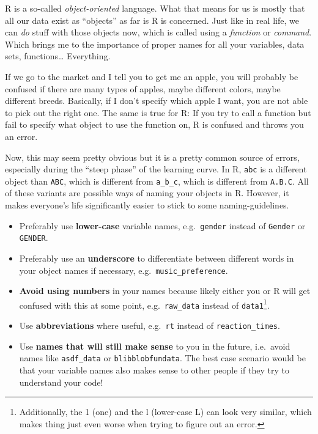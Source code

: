 \documentclass[
]{book}
\providecommand{\tightlist}{%
  \setlength{\itemsep}{0pt}\setlength{\parskip}{0pt}}
\begin{document}
R is a so-called \emph{object-oriented} language.
What that means for us is mostly that all our data exist as ``objects'' as far is R is concerned.
Just like in real life, we can \emph{do} stuff with those objects now, which is called using a \emph{function} or \emph{command}.
Which brings me to the importance of proper names for all your variables, data sets, functions\ldots{}
Everything.

If we go to the market and I tell you to get me an apple, you will probably be confused if there are many types of apples, maybe different colors, maybe different breeds.
Basically, if I don't specify which apple I want, you are not able to pick out the right one.
The same is true for R: If you try to call a function but fail to specify what object to use the function on, R is confused and throws you an error.

Now, this may seem pretty obvious but it is a pretty common source of errors, especially during the ``steep phase'' of the learning curve.
In R, \texttt{abc} is a different object than \texttt{ABC}, which is different from \texttt{a\_b\_c}, which is different from \texttt{A.B.C}. All of these variants are possible ways of naming your objects in R.
However, it makes everyone's life significantly easier to stick to some naming-guidelines.

\begin{itemize}
\tightlist
\item
  Preferably use \textbf{lower-case} variable names, e.g.~\texttt{gender} instead of \texttt{Gender} or \texttt{GENDER}.
\item
  Preferably use an \textbf{underscore} to differentiate between different words in your object names if necessary, e.g.~\texttt{music\_preference}.
\item
  \textbf{Avoid using numbers} in your names because likely either you or R will get confused with this at some point, e.g.~\texttt{raw\_data} instead of \texttt{data1}\footnote{Additionally, the 1 (one) and the l (lower-case L) can look very similar, which makes thing just even worse when trying to figure out an error.}.
\item
  Use \textbf{abbreviations} where useful, e.g.~\texttt{rt} instead of \texttt{reaction\_times}.
\item
  Use \textbf{names that will still make sense} to you in the future, i.e.~avoid names like \texttt{asdf\_data} or \texttt{blibblobfundata}. The best case scenario would be that your variable names also makes sense to other people if they try to understand your code!
\end{itemize}
\end{document}
